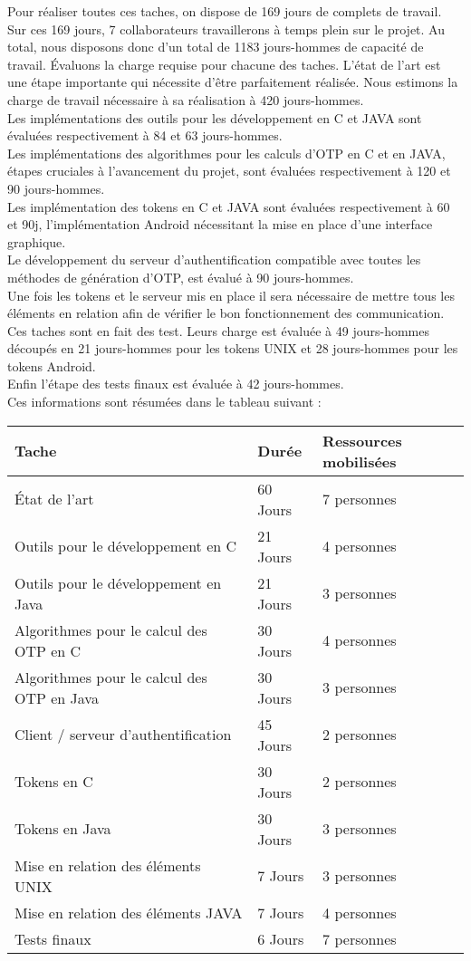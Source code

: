 \documentclass{../../res/univ-projet}
\begin{document}
Pour réaliser toutes ces taches, on dispose de 169 jours de complets de travail. Sur ces 169 jours, 7 collaborateurs travaillerons à temps plein sur le projet.
Au total, nous disposons donc d'un total de 1183 jours-hommes de capacité de travail.
Évaluons la charge requise pour chacune des taches.
L'état de l'art est une étape importante qui nécessite d'être parfaitement réalisée. Nous estimons la charge de travail nécessaire à sa réalisation à 420 jours-hommes. \\
Les implémentations des outils pour les développement en C et JAVA sont évaluées respectivement à 84 et 63 jours-hommes. \\
Les implémentations des algorithmes pour les calculs d'OTP en C et en JAVA, étapes cruciales à l'avancement du projet, sont évaluées respectivement à 120 et 90 jours-hommes. \\
Les implémentation des tokens en C et JAVA sont évaluées respectivement à 60 et 90j, l'implémentation Android nécessitant la mise en place d'une interface graphique. \\
Le développement du serveur d'authentification compatible avec toutes les méthodes de génération d'OTP, est évalué à 90 jours-hommes. \\
Une fois les tokens et le serveur mis en place il sera nécessaire de mettre tous les éléments en relation afin de vérifier le bon fonctionnement des communication. Ces taches sont en fait des test. Leurs charge est évaluée à 49 jours-hommes découpés en 21 jours-hommes pour les tokens UNIX et 28 jours-hommes pour les tokens Android.\\
Enfin l'étape des tests finaux est évaluée à 42 jours-hommes.\\
Ces informations sont résumées dans le tableau suivant :
\newline

\begin{tabular}{|l|l|l|}
 \hline
Tache & Durée & Ressources mobilisées \\ \hline
État de l'art & 60 Jours & 7 personnes \\
Outils pour le développement en C & 21 Jours & 4 personnes \\
Outils pour le développement en Java & 21 Jours & 3 personnes \\
Algorithmes pour le calcul des OTP en C & 30 Jours & 4 personnes \\
Algorithmes pour le calcul des OTP en Java & 30 Jours & 3 personnes \\
Client / serveur d'authentification & 45 Jours & 2 personnes \\
Tokens en C & 30 Jours & 2 personnes \\
Tokens en Java & 30 Jours & 3 personnes \\
Mise en relation des éléments UNIX & 7 Jours & 3 personnes \\
Mise en relation des éléments JAVA & 7 Jours & 4 personnes \\
Tests finaux & 6 Jours & 7 personnes \\ \hline
\end{tabular}
\end{document}

